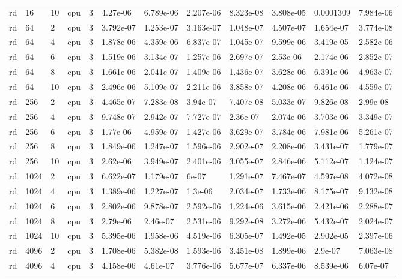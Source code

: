 \begin{tabular}{llllllllllll}
rd & 16 & 10 & cpu & 3 & 4.27e-06 & 6.789e-06 & 2.207e-06 & 8.323e-08 & 3.808e-05 & 0.0001309 & 7.984e-06 \\
rd & 64 & 2 & cpu & 3 & 3.792e-07 & 1.253e-07 & 3.163e-07 & 1.048e-07 & 4.507e-07 & 1.654e-07 & 3.774e-08 \\
rd & 64 & 4 & cpu & 3 & 1.878e-06 & 4.359e-06 & 6.837e-07 & 1.045e-07 & 9.599e-06 & 3.419e-05 & 2.582e-06 \\
rd & 64 & 6 & cpu & 3 & 1.519e-06 & 3.134e-07 & 1.257e-06 & 2.697e-07 & 2.53e-06 & 2.174e-06 & 2.852e-07 \\
rd & 64 & 8 & cpu & 3 & 1.661e-06 & 2.041e-07 & 1.409e-06 & 1.436e-07 & 3.628e-06 & 6.391e-06 & 4.963e-07 \\
rd & 64 & 10 & cpu & 3 & 2.496e-06 & 5.109e-07 & 2.211e-06 & 3.858e-07 & 4.208e-06 & 6.461e-06 & 4.559e-07 \\
rd & 256 & 2 & cpu & 3 & 4.465e-07 & 7.283e-08 & 3.94e-07 & 7.407e-08 & 5.033e-07 & 9.826e-08 & 2.99e-08 \\
rd & 256 & 4 & cpu & 3 & 9.748e-07 & 2.942e-07 & 7.727e-07 & 2.36e-07 & 2.074e-06 & 3.703e-06 & 3.349e-07 \\
rd & 256 & 6 & cpu & 3 & 1.77e-06 & 4.959e-07 & 1.427e-06 & 3.629e-07 & 3.784e-06 & 7.981e-06 & 5.261e-07 \\
rd & 256 & 8 & cpu & 3 & 1.849e-06 & 1.247e-07 & 1.596e-06 & 2.902e-07 & 2.208e-06 & 3.431e-07 & 1.779e-07 \\
rd & 256 & 10 & cpu & 3 & 2.62e-06 & 3.949e-07 & 2.401e-06 & 3.055e-07 & 2.846e-06 & 5.112e-07 & 1.124e-07 \\
rd & 1024 & 2 & cpu & 3 & 6.622e-07 & 1.179e-07 & 6e-07 & 1.291e-07 & 7.467e-07 & 4.597e-08 & 4.072e-08 \\
rd & 1024 & 4 & cpu & 3 & 1.389e-06 & 1.227e-07 & 1.3e-06 & 2.034e-07 & 1.733e-06 & 8.175e-07 & 9.132e-08 \\
rd & 1024 & 6 & cpu & 3 & 2.802e-06 & 9.878e-07 & 2.592e-06 & 1.224e-06 & 3.615e-06 & 2.421e-06 & 2.288e-07 \\
rd & 1024 & 8 & cpu & 3 & 2.79e-06 & 2.46e-07 & 2.531e-06 & 9.292e-08 & 3.272e-06 & 5.432e-07 & 2.024e-07 \\
rd & 1024 & 10 & cpu & 3 & 5.395e-06 & 1.958e-06 & 4.519e-06 & 6.305e-07 & 1.492e-05 & 2.902e-05 & 2.397e-06 \\
rd & 4096 & 2 & cpu & 3 & 1.708e-06 & 5.382e-08 & 1.593e-06 & 3.451e-08 & 1.899e-06 & 2.9e-07 & 7.063e-08 \\
rd & 4096 & 4 & cpu & 3 & 4.158e-06 & 4.61e-07 & 3.776e-06 & 5.677e-07 & 6.337e-06 & 8.539e-06 & 6.07e-07 \\

\end{tabular}
